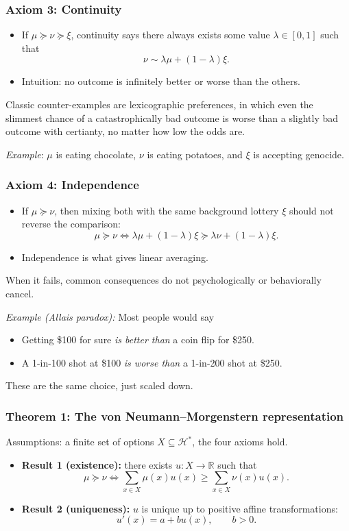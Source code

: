 \documentclass[10pt,a4paper]{beamer}
\newcommand{\Hcal}{\mathcal{H}}
\newcommand{\R}{\mathbb{R}}
\newcommand{\pref}{\succcurlyeq}
\newcommand{\indiff}{\sim}
\begin{document}
\begin{frame}
\frametitle{Axiom 3: Continuity}
\begin{itemize}
    \item If $\mu\pref\nu\pref\xi$, 
    continuity says there always exists some value $\lambda\in[0,1]$ such that
    $$
    \nu\indiff \lambda\mu+(1-\lambda)\xi.
    $$
    \pause
    \item Intuition: no outcome is infinitely better or worse than the others.
    \pause
\end{itemize}
\vspace{0.4cm}
Classic counter-examples are lexicographic preferences, in which even the slimmest
chance of a catastrophically bad outcome is worse than a slightly bad outcome
with certianty, no matter how low the odds are.
\vspace{0.4cm}

\textit{Example}: $\mu$ is eating chocolate, $\nu$ is eating potatoes, and $\xi$ is accepting genocide.
\end{frame}



\begin{frame}
\frametitle{Axiom 4: Independence}
\begin{itemize}
    \item If $\mu\pref\nu$, then mixing both with the same background lottery
    $\xi$ should not reverse the comparison:
    $$
    \mu\pref\nu
    \Longleftrightarrow
    \lambda\mu+(1-\lambda)\xi
    \pref
    \lambda\nu+(1-\lambda)\xi.
    $$
    \pause
    \item Independence is what gives linear averaging.
    \pause
\end{itemize}
When it fails, common consequences do not psychologically or behaviorally cancel.
\vspace{0.4cm}

\textit{Example (Allais paradox):} Most people would say
\begin{itemize}
    \item Getting \$100 for sure \textit{is better than} a coin flip for \$250.
    \item A 1-in-100 shot at \$100 \textit{is worse than} a 1-in-200 shot at \$250.
\end{itemize}
These are the same choice, just scaled down.
\end{frame}


\begin{frame}
\frametitle{Theorem 1: The von Neumann--Morgenstern representation}

Assumptions: a finite set of options $X\subseteq\Hcal^*$, 
the four axioms hold.
\begin{itemize}
    \item  \textbf{Result 1 (existence):} there exists $u:X\to\R$ such that
    $$
    \mu\pref\nu
    \Longleftrightarrow
    \sum_{x\in X}\mu(x)u(x)
    \geq
    \sum_{x\in X}\nu(x)u(x).
    $$
    \pause
    \item \textbf{Result 2 (uniqueness):} $u$ is unique up to positive affine transformations:
    $$
    u'(x)=a+bu(x),\qquad b>0.
    $$
\end{itemize}
\end{frame}
\end{document}
